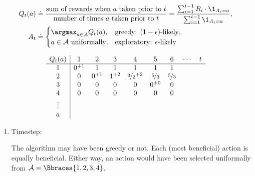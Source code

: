 \begin{solution}

\begin{align*}
    Q_t(a)
    & \doteq
    \frac
    {
        \text{sum of rewards when $a$ taken prior to $t$}
    }{
        \text{number of times $a$ taken prior to $t$}
    }
    =
    \frac
    {
        \sum_{i=1}^{t-1}
            R_i \cdot \1_{A_i = a}
    }{
        \sum_{i=1}^{t-1}
            \1_{A_i = a}
    }, \\
    A_t
    & \doteq
    \begin{cases}
        \argmax_{a \in \mathcal A} Q_t(a),    & \text{greedy: $(1 - \epsilon)$-likely}, \\
        a \in \mathcal A ~\text{uniformally}, & \text{exploratory: $\epsilon$-likely}
    \end{cases}
\end{align*}

\begin{align*}
    \begin{array}{c|cccccccc}
        Q_t(a) & 1      & 2      & 3      & 4                    & 5               & 6               & \cdots & t \\ \hline
        1      & 0^{+1} & 1      & 1      & 1                    & 1               & 1               &        &   \\
        2      & 0      & 0^{+1} & 1^{+2} & \nicefrac{3}{2}^{+2} & \nicefrac{5}{3} & \nicefrac{5}{3} &        &   \\
        3      & 0      & 0      & 0      & 0                    & 0^{+0}          & 0               &        &   \\
        4      & 0      & 0      & 0      & 0                    & 0               & 0               &        &   \\
        \vdots &        &        &        &                      &                 &                 &        &   \\
        a      &        &        &        &                      &                 &                 &        &   \\
    \end{array}
\end{align*}

\begin{enumerate}[label = \arabic*.]

    \item Timestep:
    
    The algorithm may have been greedy or not.
    Each (most beneficial) action is equally beneficial.
    Either way, an action would have been selected uniformally from $\mathcal A = \Bbraces{1, 2, 3, 4}$.


\end{enumerate}
\end{solution}
